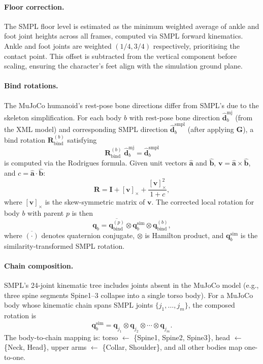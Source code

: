 \paragraph{Floor correction.}
The SMPL floor level is estimated as the minimum weighted average of ankle and foot joint heights across all frames, computed via SMPL forward kinematics. Ankle and foot joints are weighted $(1/4, 3/4)$ respectively, prioritising the contact point. This offset is subtracted from the vertical component before scaling, ensuring the character's feet align with the simulation ground plane.

\paragraph{Bind rotations.}
The MuJoCo humanoid's rest-pose bone directions differ from SMPL's due to the skeleton simplification. For each body $b$ with rest-pose bone direction $\hat{\mathbf{d}}_b^{\mathrm{mj}}$ (from the XML model) and corresponding SMPL direction $\hat{\mathbf{d}}_b^{\mathrm{smpl}}$ (after applying $\mathbf{G}$), a bind rotation $\mathbf{R}_{\mathrm{bind}}^{(b)}$ satisfying
\[
    \mathbf{R}_{\mathrm{bind}}^{(b)}\; \hat{\mathbf{d}}_b^{\mathrm{mj}} = \hat{\mathbf{d}}_b^{\mathrm{smpl}}
\]
is computed via the Rodrigues formula. Given unit vectors $\hat{\mathbf{a}}$ and $\hat{\mathbf{b}}$, $\mathbf{v} = \hat{\mathbf{a}} \times \hat{\mathbf{b}}$, and $c = \hat{\mathbf{a}} \cdot \hat{\mathbf{b}}$:
\[
    \mathbf{R} = \mathbf{I} + [\mathbf{v}]_\times + \frac{[\mathbf{v}]_\times^2}{1 + c},
\]
where $[\mathbf{v}]_\times$ is the skew-symmetric matrix of $\mathbf{v}$. The corrected local rotation for body $b$ with parent $p$ is then
\[
    \mathbf{q}_b = \overline{\mathbf{q}_{\mathrm{bind}}^{(p)}} \otimes \mathbf{q}_b^{\mathrm{sim}} \otimes \mathbf{q}_{\mathrm{bind}}^{(b)},
\]
where $\overline{(\cdot)}$ denotes quaternion conjugate, $\otimes$ is Hamilton product, and $\mathbf{q}_b^{\mathrm{sim}}$ is the similarity-transformed SMPL rotation.

\paragraph{Chain composition.}
SMPL's 24-joint kinematic tree includes joints absent in the MuJoCo model (e.g., three spine segments Spine1--3 collapse into a single torso body). For a MuJoCo body whose kinematic chain spans SMPL joints $\{j_1, \ldots, j_m\}$, the composed rotation is
\[
    \mathbf{q}_b^{\mathrm{sim}} = \mathbf{q}_{j_1} \otimes \mathbf{q}_{j_2} \otimes \cdots \otimes \mathbf{q}_{j_m}.
\]
The body-to-chain mapping is: torso $\leftarrow$ \{Spine1, Spine2, Spine3\}, head $\leftarrow$ \{Neck, Head\}, upper arms $\leftarrow$ \{Collar, Shoulder\}, and all other bodies map one-to-one.

